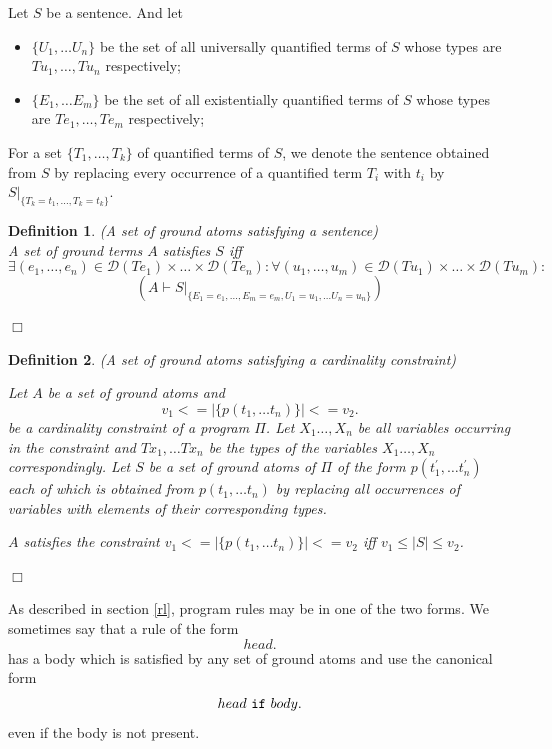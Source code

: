 \documentclass[a4paper,10pt]{article}
\newtheorem{definition}{Definition}
\begin{document}
\noindent
Let $S$ be a sentence. And let
\begin{itemize}
\item $\{U_1,\ldots U_n\}$ be the set of all universally quantified terms  of $S$ whose  types are $Tu_1,\ldots, Tu_n$ respectively;
\item $\{E_1, \ldots E_m\}$ be the set of all existentially quantified terms  of $S$ whose  types are $Te_1,\ldots, Te_m$ respectively;
\end{itemize}
\noindent\medskip
For a set $\{T_1,\ldots,T_k\}$ of quantified terms of $S$,  we denote the sentence obtained from $S$ by replacing every occurrence of a quantified term $T_i$  with $t_i$ by $S|_{\{T_k = t_1, \ldots, T_k = t_k\}}$.

\begin{definition}(A set of ground atoms satisfying a sentence)\\
\rm{
   A set of ground terms $A$ satisfies  $S$ iff
  $$ \exists (e_1,\ldots,e_n)  \in \mathcal{D}(Te_1) \times \ldots \times \mathcal{D}(Te_n): 
\forall (u_1,\ldots,u_m) \in  \mathcal{D}(Tu_1) \times \ldots \times \mathcal{D}(Tu_m):$$ $$(A \vdash S|_{\{E_1 = e_1, \ldots, E_m = e_m, U_1 = u_1,\ldots U_n = u_n\}})$$
}

\hfill$\Box$
\end{definition}

\begin{definition}(A set of ground atoms satisfying a cardinality constraint)\\
\rm{
Let $A$ be a set of ground atoms and $$v_1 <= |\{p(t_1,\ldots t_n)\}| <= v_2.$$ be a cardinality constraint of a program $\Pi$.
Let $X_1\ldots,X_n$ be all variables occurring in the constraint and $Tx_1,\ldots Tx_n$ be the types of the variables $X_1\ldots,X_n$ correspondingly. Let $S$ be a set of ground atoms of $\Pi$ of the form $p(t_1^\prime,\ldots t_n^\prime)$ each of which is obtained from $p(t_1,\ldots t_n)$ by replacing all occurrences of variables  with elements of their corresponding types.

\noindent\medskip
$A$ satisfies  the constraint $v_1 <= |\{p(t_1,\ldots t_n)\}| <= v_2$ iff $v_1 \le |S| \le v_2$. 

\hfill$\Box$

}
\end{definition}


As described in section \ref{rl}, program rules may be in one of the two forms. We sometimes say that a rule of the form $$head.$$ has a body which is satisfied by any set of ground atoms and use the canonical form $$head~\mbox{\texttt{if}}~body.$$ even if the body is not present.
\end{document}
